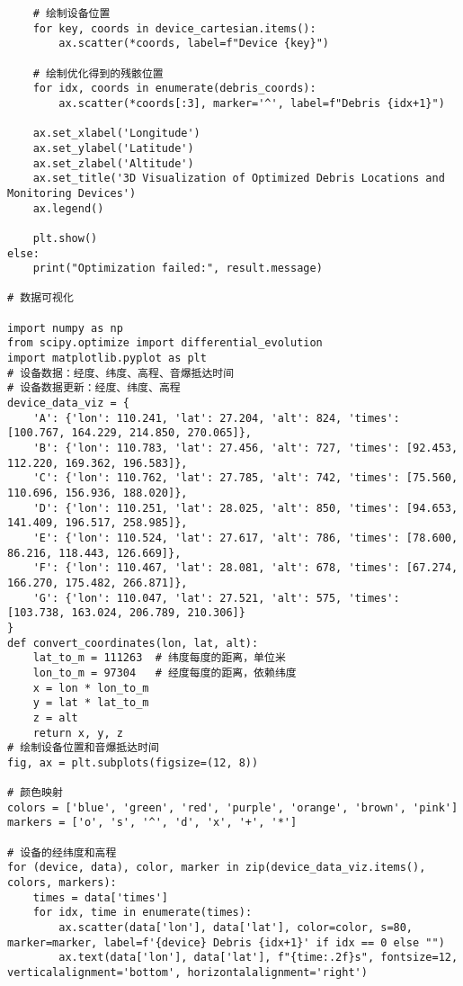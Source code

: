 \documentclass[withoutpreface,bwprint,12pt,a4paper]{cumcmthesis}
\begin{document}
\begin{appendices}
\begin{lstlisting}
    # 绘制设备位置
    for key, coords in device_cartesian.items():
        ax.scatter(*coords, label=f"Device {key}")

    # 绘制优化得到的残骸位置
    for idx, coords in enumerate(debris_coords):
        ax.scatter(*coords[:3], marker='^', label=f"Debris {idx+1}")

    ax.set_xlabel('Longitude')
    ax.set_ylabel('Latitude')
    ax.set_zlabel('Altitude')
    ax.set_title('3D Visualization of Optimized Debris Locations and Monitoring Devices')
    ax.legend()

    plt.show()
else:
    print("Optimization failed:", result.message)

# 数据可视化

import numpy as np
from scipy.optimize import differential_evolution
import matplotlib.pyplot as plt
# 设备数据：经度、纬度、高程、音爆抵达时间
# 设备数据更新：经度、纬度、高程
device_data_viz = {
    'A': {'lon': 110.241, 'lat': 27.204, 'alt': 824, 'times': [100.767, 164.229, 214.850, 270.065]},
    'B': {'lon': 110.783, 'lat': 27.456, 'alt': 727, 'times': [92.453, 112.220, 169.362, 196.583]},
    'C': {'lon': 110.762, 'lat': 27.785, 'alt': 742, 'times': [75.560, 110.696, 156.936, 188.020]},
    'D': {'lon': 110.251, 'lat': 28.025, 'alt': 850, 'times': [94.653, 141.409, 196.517, 258.985]},
    'E': {'lon': 110.524, 'lat': 27.617, 'alt': 786, 'times': [78.600, 86.216, 118.443, 126.669]},
    'F': {'lon': 110.467, 'lat': 28.081, 'alt': 678, 'times': [67.274, 166.270, 175.482, 266.871]},
    'G': {'lon': 110.047, 'lat': 27.521, 'alt': 575, 'times': [103.738, 163.024, 206.789, 210.306]}
}
def convert_coordinates(lon, lat, alt):
    lat_to_m = 111263  # 纬度每度的距离，单位米
    lon_to_m = 97304   # 经度每度的距离，依赖纬度
    x = lon * lon_to_m
    y = lat * lat_to_m
    z = alt
    return x, y, z
# 绘制设备位置和音爆抵达时间
fig, ax = plt.subplots(figsize=(12, 8))

# 颜色映射
colors = ['blue', 'green', 'red', 'purple', 'orange', 'brown', 'pink']
markers = ['o', 's', '^', 'd', 'x', '+', '*']

# 设备的经纬度和高程
for (device, data), color, marker in zip(device_data_viz.items(), colors, markers):
    times = data['times']
    for idx, time in enumerate(times):
        ax.scatter(data['lon'], data['lat'], color=color, s=80, marker=marker, label=f'{device} Debris {idx+1}' if idx == 0 else "")
        ax.text(data['lon'], data['lat'], f"{time:.2f}s", fontsize=12, verticalalignment='bottom', horizontalalignment='right')


\end{lstlisting}
\end{appendices}
\end{document}
